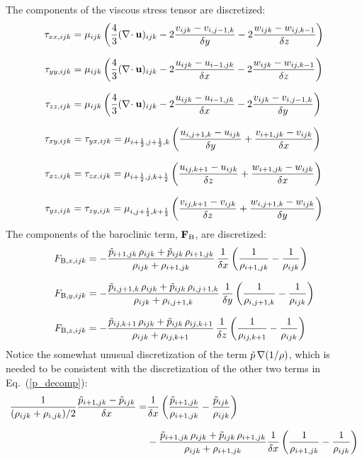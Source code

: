 The components of the viscous stress tensor are discretized:
\begin{align}
\tau_{xx,ijk} &= \mu_{ijk} \left( \frac{4}{3} (\nabla\!\cdot {\mathbf{u}})_{ijk} - 2 \frac{v_{ijk}-v_{i,j-1,k}}{\delta y} - 2 \frac{w_{ijk}-w_{ij,k-1}}{\delta z} \right)  \\[.1in]
\tau_{yy,ijk} &= \mu_{ijk} \left( \frac{4}{3} (\nabla\!\cdot {\mathbf{u}})_{ijk} - 2 \frac{u_{ijk}-u_{i-1,jk}}{\delta x}  - 2 \frac{w_{ijk}-w_{ij,k-1}}{\delta z} \right)  \\[.1in]
\tau_{zz,ijk} &= \mu_{ijk} \left( \frac{4}{3} (\nabla\!\cdot {\mathbf{u}})_{ijk} - 2 \frac{u_{ijk}-u_{i-1,jk}}{\delta x}  - 2 \frac{v_{ijk}-v_{i,j-1,k}}{\delta y} \right)  \\[.1in]
\tau_{xy,ijk} &= \tau_{yx,ijk} = \mu_{i+\frac{1}{2},j+\frac{1}{2},k} \left( \frac{u_{i,j+1,k}-u_{ijk}}{\delta y} + \frac{v_{i+1,jk} -v_{ijk}}{\delta x} \right) \\[.1in]
\tau_{xz,ijk} &= \tau_{zx,ijk} = \mu_{i+\frac{1}{2},j,k+\frac{1}{2}} \left( \frac{u_{ij,k+1}-u_{ijk}}{\delta z}  + \frac{w_{i+1,jk}-w_{ijk}}{\delta x} \right) \\[.1in]
\tau_{yz,ijk} &= \tau_{zy,ijk} = \mu_{i,j+\frac{1}{2},k+\frac{1}{2}} \left( \frac{v_{ij,k+1}-v_{ijk}}{\delta z}  + \frac{w_{i,j+1,k}-w_{ijk}}{\delta y} \right)
\end{align}
The components of the baroclinic term, ${\mathbf{F}}_{\rm B}$, are discretized:
\begin{align}
F_{{\rm B},x,ijk} &=  - \frac{\tilde{p}_{i+1,jk}  \, \rho_{ijk} + \tilde{p}_{ijk} \, \rho_{i+1,jk}}{\rho_{ijk}+\rho_{i+1,jk}}   \, \frac{1}{\delta x} \left( \frac{1}{\rho_{i+1,jk}}  - \frac{1}{\rho_{ijk}} \right) \\[.1in]
F_{{\rm B},y,ijk} &=  - \frac{\tilde{p}_{i,j+1,k} \, \rho_{ijk} + \tilde{p}_{ijk} \, \rho_{i,j+1,k}}{\rho_{ijk}+\rho_{i,j+1,k}} \, \frac{1}{\delta y} \left( \frac{1}{\rho_{i,j+1,k}} - \frac{1}{\rho_{ijk}} \right) \\[.1in]
F_{{\rm B},z,ijk} &=  - \frac{\tilde{p}_{ij,k+1}  \, \rho_{ijk} + \tilde{p}_{ijk} \, \rho_{ij,k+1}}{\rho_{ijk}+\rho_{ij,k+1}}   \, \frac{1}{\delta z} \left( \frac{1}{\rho_{ij,k+1}}  - \frac{1}{\rho_{ijk}} \right)
\end{align}
Notice the somewhat unusual discretization of the term $\tilde{p} \, \nabla (1/\rho)$, which is needed to be consistent with the discretization of the other two terms in Eq.~(\ref{p_decomp}):
\begin{align}
  \frac{1}{(\rho_{ijk}+\rho_{i,jk})/2} \frac{\tilde{p}_{i+1,jk}-\tilde{p}_{ijk}}{\delta x} =& \frac{1}{\delta x} \left( \frac{\tilde{p}_{i+1,jk}}{\rho_{i+1,jk}}-\frac{\tilde{p}_{ijk}}{\rho_{ijk}} \right) \nonumber \\[.1in]
  & - \frac{\tilde{p}_{i+1,jk} \, \rho_{ijk} + \tilde{p}_{ijk} \, \rho_{i+1,jk}}{\rho_{ijk}+\rho_{i+1,jk}} \frac{1}{\delta x} \left( \frac{1}{\rho_{i+1,jk}} - \frac{1}{\rho_{ijk}} \right)
\end{align}



